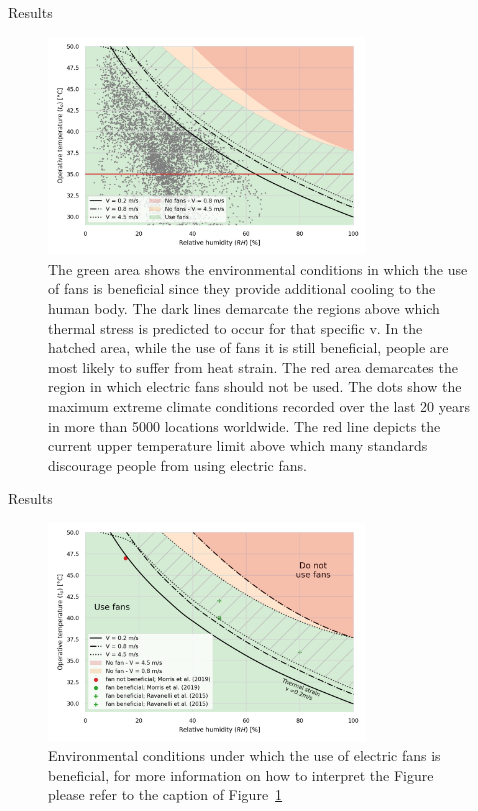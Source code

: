 \documentclass[aspectratio=169]{beamer}
\begin{document}
    \begin{frame}{Results}
        \begin{figure}[thb!]
            \centering
            \includegraphics[width=0.75\textwidth]{figures/use_fans}
            \caption{The green area shows the environmental conditions in which the use of fans is beneficial since they provide additional cooling to the human body.
            The dark lines demarcate the regions above which thermal stress is predicted to occur for that specific \ac{v}.
            In the hatched area, while the use of fans it is still beneficial, people are most likely to suffer from heat strain.
            The red area demarcates the region in which electric fans should not be used.
            The dots show the maximum extreme climate conditions recorded over the last 20 years in more than 5000 locations worldwide.
            The red line depicts the current upper temperature limit above which many standards discourage people from using electric fans.}
            \label{fig:energy_storage_delta}
        \end{figure}
    \end{frame}

    \begin{frame}{Results}
        \begin{figure}[thb!]
            \centering
            \includegraphics[width=0.75\textwidth]{figures/summary_use_fans_comparison_experimental}
            \caption{Environmental conditions under which the use of electric fans is beneficial, for more information on how to interpret the Figure please refer to the caption of Figure~\ref{fig:energy_storage_delta}
            }
            \label{fig:use_fans_experimental}
        \end{figure}
    \end{frame}
\end{document}
